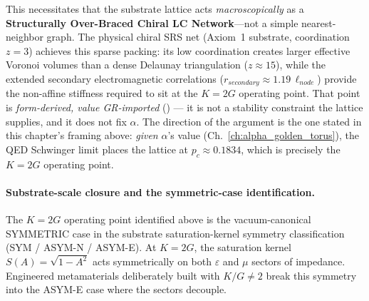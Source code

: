 This necessitates that the substrate lattice acts \textit{macroscopically} as a \textbf{Structurally Over-Braced Chiral LC Network}---not a simple nearest-neighbor graph. The physical chiral SRS net (Axiom~1 substrate, coordination $z=3$) achieves this sparse packing: its low coordination creates larger effective Voronoi volumes than a dense Delaunay triangulation ($z \approx 15$), while the extended secondary electromagnetic correlations ($r_{secondary} \approx 1.19\, \ell_{node}$) provide the non-affine stiffness required to sit at the $K = 2G$ operating point.
That point is \emph{form-derived, value GR-imported} () --- it is not a stability constraint the lattice supplies, and it does not fix $\alpha$. The direction of the argument is the one stated in this chapter's framing above: \emph{given} $\alpha$'s value (Ch.~\ref{ch:alpha_golden_torus}), the QED Schwinger limit places the lattice at $p_c \approx 0.1834$, which is precisely the $K = 2G$ operating point.

\paragraph{Substrate-scale closure and the symmetric-case identification.}
The $K = 2G$ operating point identified
above is the vacuum-canonical SYMMETRIC case in the substrate
saturation-kernel symmetry classification (SYM / ASYM-N / ASYM-E).
At $K = 2G$, the saturation kernel $S(A) = \sqrt{1 - A^2}$ acts symmetrically
on both $\varepsilon$ and $\mu$ sectors of impedance. Engineered metamaterials
deliberately built with $K/G \neq 2$ break this symmetry into the ASYM-E
case where the sectors decouple.


